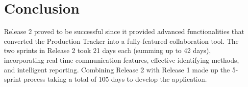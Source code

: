 \label{sec:sprint5-interfaces}

\section{Conclusion}
\label{sec:release2-conclusion}

Release 2 proved to be successful since it provided advanced functionalities that converted the Production Tracker into a fully-featured collaboration tool. The two sprints in Release 2 took 21 days each (summing up to 42 days), incorporating real-time communication features, effective identifying methods, and intelligent reporting. Combining Release 2 with Release 1 made up the 5-sprint process taking a total of 105 days to develop the application.
